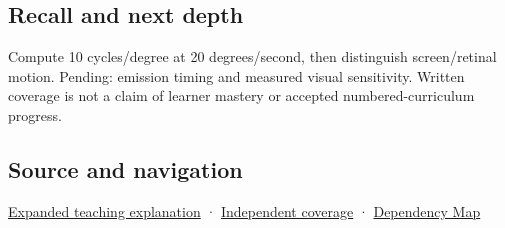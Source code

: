 \subsection{Recall and next depth}\label{appendix-70895739febb-recall-and-next-depth}

Compute 10 cycles/degree at 20 degrees/second, then distinguish screen/retinal motion. Pending: emission timing and measured visual sensitivity. Written coverage is not a claim of learner mastery or accepted numbered-curriculum progress.

\subsection{Source and navigation}\label{appendix-70895739febb-source-and-navigation}

\hyperref[04-visual-computing-ii-ch042-a-gaze-sample-needs-a-time-as-well-as-a-direction]{Expanded teaching explanation} · \hyperref[appendix-fd090d982a15-xr01---independent-seeing-and-representation-source]{Independent coverage} · \hyperref[appendix-4ad47bdd269a]{Dependency Map}
